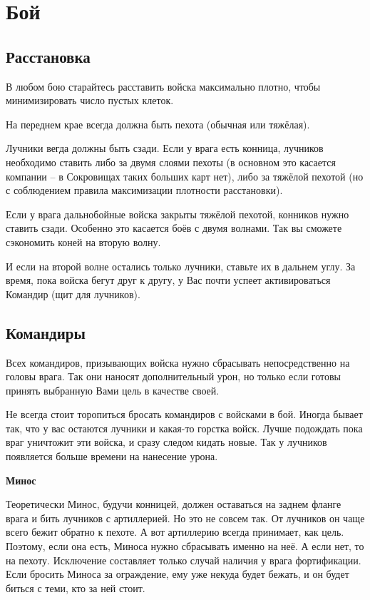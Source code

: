 \section{Бой}

\subsection{Расстановка}

В любом бою старайтесь расставить войска максимально плотно, чтобы минимизировать число пустых клеток.

На переднем крае всегда должна быть пехота (обычная или тяжёлая).

Лучники вегда должны быть сзади.
Если у врага есть конница, лучников необходимо ставить либо за двумя слоями пехоты (в основном это касается компании -- в Сокровищах таких больших карт нет), либо за тяжёлой пехотой (но с соблюдением правила максимизации плотности расстановки).

Если у врага дальнобойные войска закрыты тяжёлой пехотой, конников нужно ставить сзади.
Особенно это касается боёв с двумя волнами.
Так вы сможете сэкономить коней на вторую волну.

И если на второй волне остались только лучники, ставьте их в дальнем углу.
За время, пока войска бегут друг к другу, у Вас почти успеет активироваться Командир (щит для лучников).

\subsection{Командиры}

Всех командиров, призывающих войска нужно сбрасывать непосредственно на головы врага.
Так они наносят дополнительный урон, но только если готовы принять выбранную Вами цель в качестве своей.

Не всегда стоит торопиться бросать командиров с войсками в бой.
Иногда бывает так, что у вас остаются лучники и какая-то горстка войск.
Лучше подождать пока враг уничтожит эти войска, и сразу следом кидать новые.
Так у лучников появляется больше времени на нанесение урона.

\textbf{Минос}

Теоретически Минос, будучи конницей, должен оставаться на заднем фланге врага и бить лучников с артиллерией.
Но это не совсем так.
От лучников он чаще всего бежит обратно к пехоте.
А вот артиллерию всегда принимает, как цель.
Поэтому, если она есть, Миноса нужно сбрасывать именно на неё.
А если нет, то на пехоту.
Исключение составляет только случай наличия у врага фортификации.
Если бросить Миноса за ограждение, ему уже некуда будет бежать, и он будет биться с теми, кто за ней стоит.

